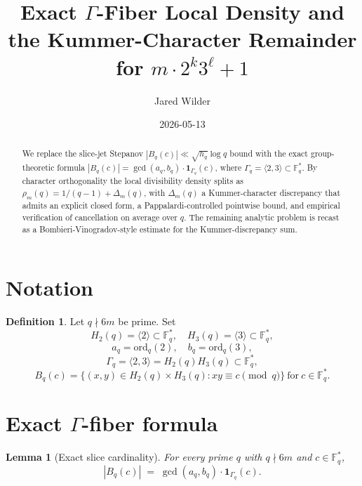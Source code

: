 \documentclass[12pt]{amsart}
\title{Exact $\Gamma$-Fiber Local Density and the Kummer-Character Remainder for $m\cdot 2^k 3^\ell+1$}
\author{Jared Wilder}
\date{2026-05-13}
\newtheorem{lemma}{Lemma}
\theoremstyle{definition}
\newtheorem{definition}{Definition}
\theoremstyle{remark}
\begin{document}
\maketitle

\begin{abstract}
We replace the slice-jet Stepanov $|B_q(c)| \ll \sqrt{h_q}\log q$ bound with the exact
group-theoretic formula $|B_q(c)| = \gcd(a_q, b_q) \cdot \mathbf{1}_{\Gamma_q}(c)$,
where $\Gamma_q = \langle 2, 3 \rangle \subset \mathbb{F}_q^*$. By character orthogonality
the local divisibility density splits as $\rho_m(q) = 1/(q-1) + \Delta_m(q)$, with
$\Delta_m(q)$ a Kummer-character discrepancy that admits an explicit closed form,
a Pappalardi-controlled pointwise bound, and empirical verification of cancellation
on average over $q$. The remaining analytic problem is recast as a
Bombieri-Vinogradov-style estimate for the Kummer-discrepancy sum.
\end{abstract}

\section{Notation}

\begin{definition}
Let $q \nmid 6m$ be prime. Set
$$
H_2(q) = \langle 2 \rangle \subset \mathbb{F}_q^*, \quad H_3(q) = \langle 3 \rangle \subset \mathbb{F}_q^*,
$$
$$
a_q = \mathrm{ord}_q(2), \quad b_q = \mathrm{ord}_q(3),
$$
$$
\Gamma_q = \langle 2, 3 \rangle = H_2(q) H_3(q) \subset \mathbb{F}_q^*,
$$
$$
B_q(c) = \{(x, y) \in H_2(q) \times H_3(q) : x y \equiv c \pmod q\}\ \text{for}\ c \in \mathbb{F}_q^*.
$$
\end{definition}

\section{Exact $\Gamma$-fiber formula}

\begin{lemma}[Exact slice cardinality]\label{lem:R682}
For every prime $q$ with $q \nmid 6m$ and $c \in \mathbb{F}_q^*$,
$$
|B_q(c)|
\;=\;
\gcd(a_q, b_q) \cdot \mathbf{1}_{\Gamma_q}(c).
$$
\end{lemma}
\end{document}
